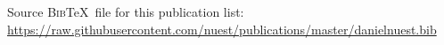 \documentclass{article}
\begin{document}
%
%
%
%
%
%

\newcommand*{\BibTeX}{\textsc{Bib}\TeX}
    
\vfill
Source \BibTeX \ file for this publication list: \url{https://raw.githubusercontent.com/nuest/publications/master/danielnuest.bib}
\clearpage
\end{document}
